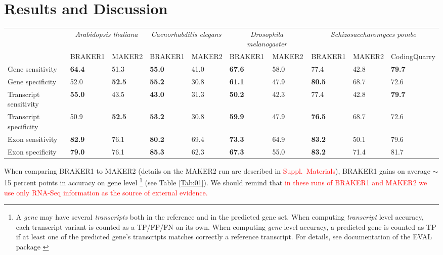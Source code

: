 \documentclass{bioinfo}
\begin{document}
\section{Results and Discussion}

\begin{table*}[!t]
{\begin{tabular}{lp{.9cm}p{.9cm}p{.9cm}p{.9cm}p{.9cm}p{.9cm}p{.9cm}p{.9cm}p{.9cm}}\hline
 & \multicolumn{2}{c}{\textit{Arabidopsis thaliana}} &  \multicolumn{2}{c}{\textit{Caenorhabditis elegans}} &  \multicolumn{2}{c}{\textit{Drosophila melanogaster}} &  \multicolumn{3}{c}{\textit{Schizosaccharomyces pombe}}\\
 & \tiny{BRAKER1} & \tiny{MAKER2} &  \tiny{BRAKER1} & \tiny{MAKER2}  & \tiny{BRAKER1} & \tiny{MAKER2} &\tiny{BRAKER1} & \tiny{MAKER2} &\tiny{CodingQuarry}\\
 \hline
Gene sensitivity        & \textbf{64.4} & 51.3          & \textbf{55.0} & 41.0 & \textbf{67.6} & 58.0 & 77.4 & 42.8 & \textbf{79.7}\\
Gene specificity        & 52.0          & \textbf{52.5} & \textbf{55.2} & 30.8 & \textbf{61.1} & 47.9 & \textbf{80.5} & 68.7 & 72.6\\
Transcript sensitivity  & \textbf{55.0} & 43.5          & \textbf{43.0} & 31.3 & \textbf{50.2} & 42.3 & 77.4 & 42.8 & \textbf{79.7}\\
Transcript specificity  & 50.9          & \textbf{52.5} & \textbf{53.2} & 30.8 & \textbf{59.9} & 47.9 & \textbf{76.5} & 68.7 & 72.6\\
Exon sensitivity        & \textbf{82.9} & 76.1          & \textbf{80.2} & 69.4 & \textbf{73.3} & 64.9 & \textbf{83.2} & 50.1 & 79.6\\
Exon specificity        & \textbf{79.0} & 76.1          & \textbf{85.3} & 62.3 & \textbf{67.3} & 55.0 & \textbf{83.2} & 71.4 & 81.7\\
\hline
\end{tabular}}{}
\end{table*}

When comparing BRAKER1 to MAKER2 (details on the MAKER2 run are described in \textcolor{red}{Suppl.~Materials}), BRAKER1 gains on average $\sim$15 percent points in accuracy on gene level
\footnote{A \textit{gene} may have several \textit{transcripts} both in the reference and in the predicted gene set. When computing \textit{transcript} level accuracy, each transcript variant is counted as a TP/FP/FN on its own. When computing \textit{gene} level accuracy, a predicted gene is counted as TP if at least one of the predicted gene's transcripts matches correctly a reference transcript. For details, see documentation of the EVAL package \citep{Eval}} 
(see Table \ref{Tab:01}).
We should remind that \textcolor{red}{in these runs of BRAKER1 and MAKER2 we use only RNA-Seq information as the source of external evidence.}
\end{document}
